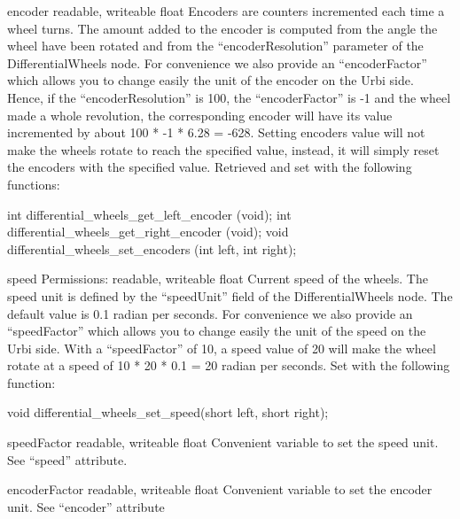 \noindent
\begin{itemize}
\begin{attribute}{encoder}
  {readable, writeable}
  {float}
  {}
  Encoders are counters incremented each time a wheel
  turns. The amount added to the encoder is computed from the angle
  the wheel have been rotated and from the ``encoderResolution''
  parameter of the DifferentialWheels node. For convenience we also
  provide an ``encoderFactor'' which allows you to change easily the
  unit of the encoder on the Urbi side.  Hence, if the
  ``encoderResolution'' is 100, the ``encoderFactor'' is -{}1 and the
  wheel made a whole revolution, the corresponding encoder will have
  its value incremented by about 100 * -{}1 * 6.28 = -{}628.  Setting
  encoders value will not make the wheels rotate to reach the
  specified value, instead, it will simply reset the encoders with the
  specified value.  Retrieved and set with the following \webots
  functions:
\begin{cxx}
int differential_wheels_get_left_encoder (void);
int differential_wheels_get_right_encoder (void);
void differential_wheels_set_encoders (int left, int right);
\end{cxx}
\end{attribute}

\begin{attribute}{speed}
  {Permissions: readable, writeable}
  {float}
  {}
  Current speed of the wheels. The speed unit is defined
  by the ``speedUnit'' field of the \webots DifferentialWheels node. The
  default value is 0.1 radian per seconds. For convenience we also
  provide an ``speedFactor'' which allows you to change easily the unit
  of the speed on the Urbi side.  With a ``speedFactor'' of 10, a speed
  value of 20 will make the wheel rotate at a speed of 10 * 20 * 0.1 =
  20 radian per seconds.  Set with the following \webots function:
\begin{cxx}
void differential_wheels_set_speed(short left, short right);
\end{cxx}
\end{attribute}

\begin{attribute}{speedFactor}
  {readable, writeable}
  {float}
  {}
  Convenient variable to set the speed unit. See ``speed''
  attribute.
\end{attribute}

\begin{attribute}{encoderFactor}
  {readable, writeable}
  {float}
  {}
  Convenient variable to set the encoder unit. See
  ``encoder'' attribute
\end{attribute}

\end{itemize}

